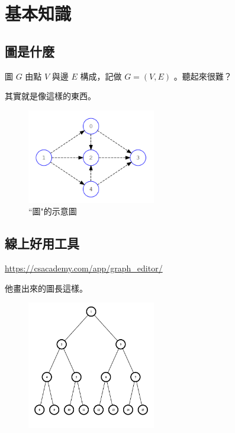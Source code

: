 \section{基本知識}
    \subsection{圖是什麼}
    圖 $G$ 由點 $V$ 與邊 $E$ 構成，記做 $G=(V,E)$ 。聽起來很難？

    其實就是像這樣的東西。
    
    \begin{figure}[ht]
        \centering
        \includegraphics[width=0.5\textwidth]{../Images/Graph1.png}
        \caption{``圖"的示意圖}
    \end{figure}

    \subsection{線上好用工具}

    \url{https://csacademy.com/app/graph_editor/}

    他畫出來的圖長這樣。

    \begin{figure}[ht]
        \centering
        \includegraphics[width=0.5\textwidth]{../Images/Graph2.png}
    \end{figure}

